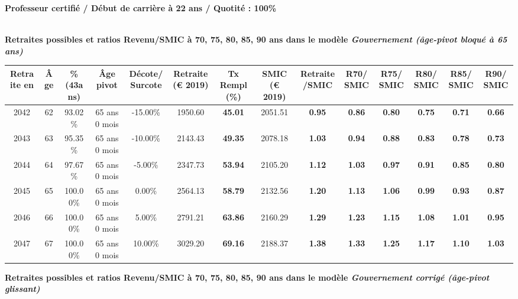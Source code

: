 {\bf \noindent Professeur certifié / Début de carrière à 22 ans / Quotité : 100\%}  ~ 

 ~\\{\bf \noindent Retraites possibles et ratios Revenu/SMIC à 70, 75, 80, 85, 90 ans dans le modèle \emph{Gouvernement (âge-pivot bloqué à 65 ans)}}  
 
\begin{adjustbox}{max width=\textwidth} 
\begin{tabular}[htb]{|c|c||c|c|c||c|c||c|c||c|c|c|c|c|} 
\hline 
 Retraite en &  Âge &  \%(43ans) &  Âge pivot &  Décote/Surcote &  Retraite (\euro{} 2019) &  Tx Rempl(\%) &  SMIC (\euro{} 2019) &  Retraite/SMIC &  R70/SMIC &  R75/SMIC &  R80/SMIC &  R85/SMIC &  R90/SMIC \\ 
\hline \hline 
 2042 &  62 &  93.02\% &  65 ans 0 mois &  -15.00\% &  1950.60 &  {\bf 45.01} &  2051.51 &  {\bf {\color{red} 0.95}} &  {\bf {\color{red} 0.86}} &  {\bf {\color{red} 0.80}} &  {\bf {\color{red} 0.75}} &  {\bf {\color{red} 0.71}} &  {\bf {\color{red} 0.66}} \\ 
\hline 
 2043 &  63 &  95.35\% &  65 ans 0 mois &  -10.00\% &  2143.43 &  {\bf 49.35} &  2078.18 &  {\bf 1.03} &  {\bf {\color{red} 0.94}} &  {\bf {\color{red} 0.88}} &  {\bf {\color{red} 0.83}} &  {\bf {\color{red} 0.78}} &  {\bf {\color{red} 0.73}} \\ 
\hline 
 2044 &  64 &  97.67\% &  65 ans 0 mois &  -5.00\% &  2347.73 &  {\bf 53.94} &  2105.20 &  {\bf 1.12} &  {\bf 1.03} &  {\bf {\color{red} 0.97}} &  {\bf {\color{red} 0.91}} &  {\bf {\color{red} 0.85}} &  {\bf {\color{red} 0.80}} \\ 
\hline 
 2045 &  65 &  100.00\% &  65 ans 0 mois &  0.00\% &  2564.13 &  {\bf 58.79} &  2132.56 &  {\bf 1.20} &  {\bf 1.13} &  {\bf 1.06} &  {\bf {\color{red} 0.99}} &  {\bf {\color{red} 0.93}} &  {\bf {\color{red} 0.87}} \\ 
\hline 
 2046 &  66 &  100.00\% &  65 ans 0 mois &  5.00\% &  2791.21 &  {\bf 63.86} &  2160.29 &  {\bf 1.29} &  {\bf 1.23} &  {\bf 1.15} &  {\bf 1.08} &  {\bf 1.01} &  {\bf {\color{red} 0.95}} \\ 
\hline 
 2047 &  67 &  100.00\% &  65 ans 0 mois &  10.00\% &  3029.20 &  {\bf 69.16} &  2188.37 &  {\bf 1.38} &  {\bf 1.33} &  {\bf 1.25} &  {\bf 1.17} &  {\bf 1.10} &  {\bf 1.03} \\ 
\hline 
\hline 
\end{tabular} 
\end{adjustbox} 
 
 \vspace{0.1cm} 
{\bf \noindent Retraites possibles et ratios Revenu/SMIC à 70, 75, 80, 85, 90 ans dans le modèle \emph{Gouvernement corrigé (âge-pivot glissant)}}  
 
